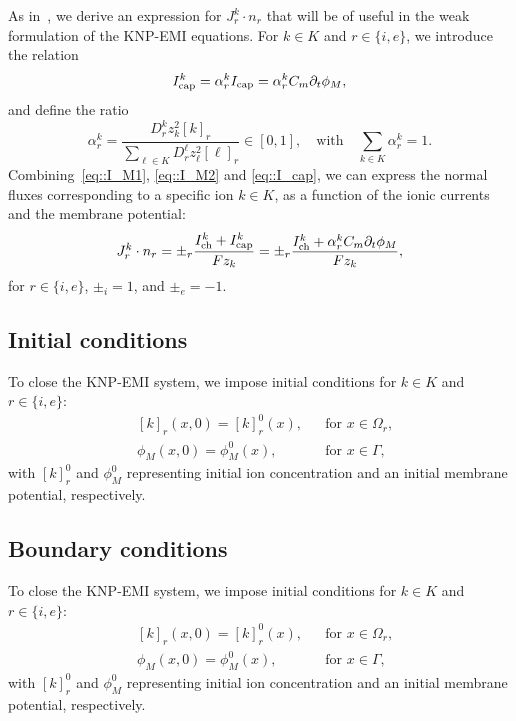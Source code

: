 \documentclass[fleqn,10pt]{wlscirep}
\begin{document}
As in~\cite[Section 2.1.3]{ellingsrud2020finite}, we derive an expression for $J_r^k \cdot n_r$ that will be of useful in the weak formulation of the KNP-EMI equations. For $k \in K$ and $r \in \{i, e\}$, we introduce the relation
\begin{equation}
  \label{eq::I_cap}
I_{\rm cap}^k = \alpha_r^kI_{\rm cap} = \alpha_r^k C_m \partial_t \phi_M,
\end{equation}
and define the ratio
\begin{equation}
  \alpha_r^k = \frac{D_r^kz_k^2[k]_r}{\sum_{\ell \in K}D_r^\ell z_\ell^2[\ell]_r} \in [0,1],
  \quad\text{with} \quad \sum_{k \in K} \alpha_r^k=1.
\end{equation}
Combining~\eqref{eq::I_M1}, \eqref{eq::I_M2} and \eqref{eq::I_cap}, we can express the normal fluxes corresponding to a specific ion $k\in K$, as a function of the ionic currents and the membrane potential:
\begin{equation}\label{eq::J_n}
J_r^k\cdot n_r= \pm_r\frac{I_{\rm ch}^k + I_{\rm cap}^k}{Fz_k}=\pm_r\frac{I_{\rm ch}^k + \alpha_r^kC_m \partial_t \phi_M}{Fz_k},
\end{equation}
for $r \in \{i, e\}$, $\pm_i=1$, and $\pm_e=-1$.

\subsection{Initial conditions}
\label{sec::ic}
To close the KNP-EMI system, we impose initial conditions for $k\in K$ and $r\in\{i,e\}$:
%
\begin{align}
&[k]_r(x,0)=[k]_r^0(x), &&\text{for } x\in\Omega_r,\\ 
&\phi_M(x,0)=\phi_M^0(x), &&\text{for } x\in\Gamma,
\end{align}
with $[k]_r^0$ and $\phi_M^0$ representing initial ion concentration and an initial membrane potential, respectively.

\subsection{Boundary conditions}
\label{sec::bc}
To close the KNP-EMI system, we impose initial conditions for $k\in K$ and $r\in\{i,e\}$:
%
\begin{align}
&[k]_r(x,0)=[k]_r^0(x), &&\text{for } x\in\Omega_r,\\ 
&\phi_M(x,0)=\phi_M^0(x), &&\text{for } x\in\Gamma,
\end{align}
with $[k]_r^0$ and $\phi_M^0$ representing initial ion concentration and an initial membrane potential, respectively.
\end{document}
